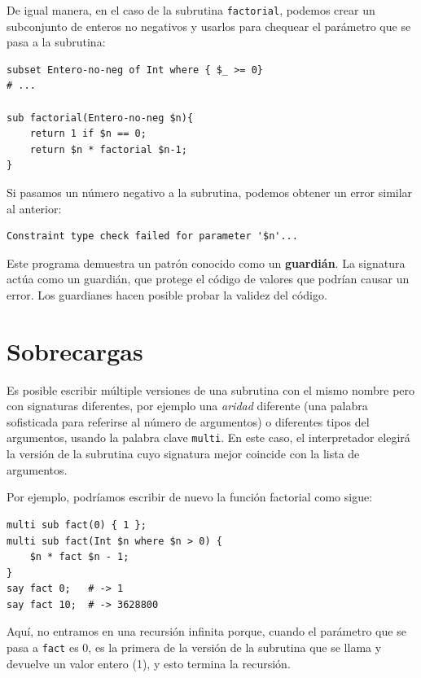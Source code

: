 De igual manera, en el caso de la subrutina {\tt factorial},
podemos crear un subconjunto de enteros no negativos y usarlos
para chequear el parámetro que se pasa a la subrutina:

\begin{verbatim}
subset Entero-no-neg of Int where { $_ >= 0}
# ...

sub factorial(Entero-no-neg $n){
    return 1 if $n == 0;
    return $n * factorial $n-1;
}
\end{verbatim}
%
Si pasamos un número negativo a la subrutina, 
podemos obtener un error similar al anterior:

\begin{verbatim}
Constraint type check failed for parameter '$n'...
\end{verbatim}

Este programa demuestra un patrón conocido como un {\bf guardián}.
La signatura actúa como un guardián, que protege el código de valores
que podrían causar un error. Los guardianes hacen posible probar la validez
del código.

\section{Sobrecargas}
\label{multisubs}

Es posible escribir múltiple versiones de una subrutina 
con el mismo nombre pero con signaturas diferentes, por ejemplo
una \emph{aridad} diferente (una palabra sofisticada para referirse
al número de argumentos) o diferentes tipos del argumentos, usando 
la palabra clave {\tt multi}. En este caso, el interpretador 
elegirá la versión de la subrutina cuyo signatura mejor coincide con
la lista de argumentos.

Por ejemplo, podríamos escribir de nuevo la función factorial como
sigue:

\begin{verbatim}
multi sub fact(0) { 1 };
multi sub fact(Int $n where $n > 0) {
    $n * fact $n - 1;
}
say fact 0;   # -> 1
say fact 10;  # -> 3628800
\end{verbatim}

Aquí, no entramos en una recursión infinita porque, cuando
el parámetro que se pasa a {\tt fact} es 0, es la primera de la
versión de la subrutina que se llama y devuelve un valor entero (1),
y esto termina la recursión.

